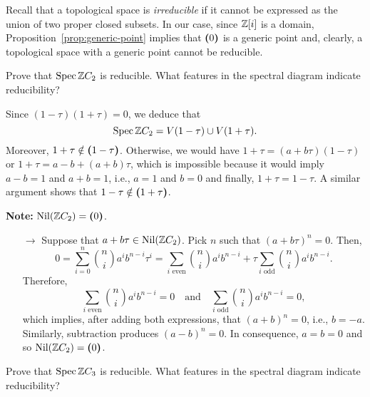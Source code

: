 \begin{solution}
    Recall that a topological space is \textsl{irreducible} if it cannot be expressed as the union of two proper closed subsets. In our case, since $\mathbb{Z}[i]$ is a domain, Proposition~\ref{prop:generic-point} implies that $\textrm{\boldmath$($}0\textrm{\boldmath$)$}$ is a generic point and, clearly, a topological space with a generic point cannot be reducible.
\end{solution}

\begin{exr}
    Prove that\/ $\operatorname{Spec}\mathbb{Z} C_2$ is reducible. What features in the spectral diagram indicate reducibility?
\end{exr}

\begin{solution}
    Since $(1-\tau)(1+\tau)=0$, we deduce that
    $$
        \operatorname{Spec}\mathbb{Z} C_2=V(1-\tau)\cup V(1+\tau).
    $$
    Moreover, $1+\tau\notin\textrm{\boldmath$($}1-\tau\textrm{\boldmath$)$}$. Otherwise, we would have $1+\tau=(a+b\tau)(1-\tau)$ or $1+\tau=a-b+(a+b)\tau$, which is impossible because it would imply $a-b=1$ and $a+b=1$, i.e., $a=1$ and $b=0$ and finally, $1+\tau=1-\tau$. A similar argument shows that $1-\tau\notin\textrm{\boldmath$($}1+\tau\textrm{\boldmath$)$}$. 

    \medskip
    
    {\small
    \textbf{Note:} \textit{$\operatorname{Nil}(\mathbb{Z} C_2)=\textrm{\boldmath$($}0\textrm{\boldmath$)$}$}.
    \begin{enumerate}
        \item[$\to$] Suppose that $a+b\tau\in\operatorname{Nil}(\mathbb{Z} C_2)$. Pick $n$ such that $(a+b\tau)^n=0$. Then,
        $$
            0 = \sum_{i=0}^n\binom{n}{i}a^ib^{n-i}\tau^i
                = \sum_{i\text{ even}}\binom{n}{i}a^ib^{n-i} +
                \tau\sum_{i\text{ odd}}\binom{n}{i}a^ib^{n-i}.
        $$
        Therefore,
        $$
            \sum_{i\text{ even}}\binom{n}{i}a^ib^{n-i} = 0
                \quad\text{and}\quad
                \sum_{i\text{ odd}}\binom{n}{i}a^ib^{n-i}=0,
        $$
        which implies, after adding both expressions, that $(a+b)^n=0$, i.e., $b=-a$. Similarly, subtraction produces $(a-b)^n=0$. In consequence, $a=b=0$ and so $\operatorname{Nil}(\mathbb{Z} C_2)=\textrm{\boldmath$($}0\textrm{\boldmath$)$}$.
    \end{enumerate}
    }
\end{solution}

\begin{exr}
    Prove that\/ $\operatorname{Spec}\mathbb{Z} C_3$ is reducible. What features in the spectral diagram indicate reducibility?
\end{exr}

